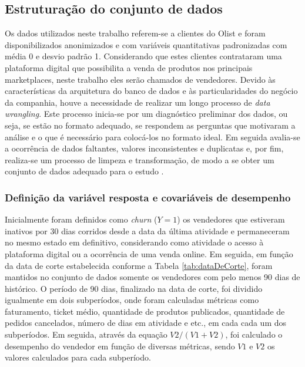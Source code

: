 \documentclass[twocolumn]{rbef}
\newcommand{\1}{\mathbbm{1}}
\begin{document}
\hypertarget{estruturauxe7uxe3o-do-conjunto-de-dados}{%
\subsection{Estruturação do conjunto de dados}\label{estruturauxe7uxe3o-do-conjunto-de-dados}}

Os dados utilizados neste trabalho referem-se a clientes do Olist e foram disponibilizados anonimizados e com variáveis quantitativas padronizadas com média 0 e desvio padrão 1. Considerando que estes clientes contrataram uma plataforma digital que possibilita a venda de produtos nos principais marketplaces, neste trabalho eles serão chamados de vendedores. Devido às características da arquitetura do banco de dados e às particularidades do negócio da companhia, houve a necessidade de realizar um longo processo de \textit{data wrangling}. Este processo inicia-se por um diagnóstico preliminar dos dados, ou seja, se estão no formato adequado, se respondem as perguntas que motivaram a análise e o que é necessário para colocá-los no formato ideal. Em seguida avalia-se a ocorrência de dados faltantes, valores inconsistentes e duplicatas e, por fim, realiza-se um processo de limpeza e transformação, de modo a se obter um conjunto de dados adequado para o estudo \cite{Kandel2011}.

\hypertarget{definiuxe7uxe3o-da-variuxe1vel-resposta-e-covariuxe1veis-de-desempenho}{%
\subsubsection{Definição da variável resposta e covariáveis de desempenho}\label{definiuxe7uxe3o-da-variuxe1vel-resposta-e-covariuxe1veis-de-desempenho}}

Inicialmente foram definidos como \textit{churn} (\(Y=1\)) os vendedores que estiveram inativos por 30 dias corridos desde a data da última atividade e permaneceram no mesmo estado em definitivo, considerando como atividade o acesso à plataforma digital ou a ocorrência de uma venda online. Em seguida, em função da data de corte estabelecida conforme a Tabela \ref{tab:dataDeCorte}, foram mantidos no conjunto de dados somente os vendedores com pelo menos 90 dias de histórico. O período de 90 dias, finalizado na data de corte, foi dividido igualmente em dois subperíodos, onde foram calculadas métricas como faturamento, ticket médio, quantidade de produtos publicados, quantidade de pedidos cancelados, número de dias em atividade e etc., em cada cada um dos subperíodos. Em seguida, através da equação \(V2 / (V1 + V2)\), foi calculado o desempenho do vendedor em função de diversas métricas, sendo \(V1\) e \(V2\) os valores calculados para cada subperíodo.
\end{document}
